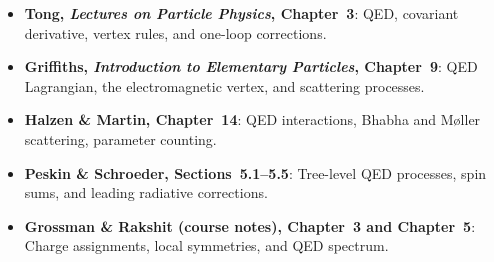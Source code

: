 \documentclass[../main.tex]{subfiles}
\begin{document}
\begin{itemize}
  \item \textbf{Tong, \textit{Lectures on Particle Physics}, Chapter~3}:
    QED, covariant derivative, vertex rules, and one-loop corrections.
  \item \textbf{Griffiths, \textit{Introduction to Elementary Particles}, Chapter~9}:
    QED Lagrangian, the electromagnetic vertex, and scattering processes.
  \item \textbf{Halzen \& Martin, Chapter~14}:
    QED interactions, Bhabha and M\o{}ller scattering, parameter counting.
  \item \textbf{Peskin \& Schroeder, Sections~5.1--5.5}:
    Tree-level QED processes, spin sums, and leading radiative corrections.
  \item \textbf{Grossman \& Rakshit (course notes), Chapter~3 and Chapter~5}:
    Charge assignments, local symmetries, and QED spectrum.
\end{itemize}
\end{document}
